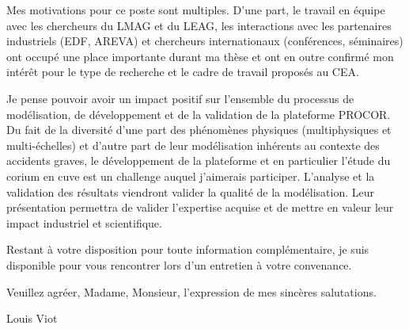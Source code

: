 \documentclass[11pt]{article}
\begin{document}
Mes motivations pour ce poste sont multiples. D'une part, le travail en équipe avec les chercheurs du LMAG et du LEAG, les interactions avec les partenaires industriels (EDF, AREVA) et chercheurs internationaux (conférences, séminaires) ont occupé une place importante durant ma thèse et ont en outre confirmé mon intérêt pour le type de recherche et le cadre de travail proposés au CEA.

Je pense pouvoir avoir un impact positif sur l'ensemble du processus de modélisation, de développement et de la validation de la plateforme PROCOR. Du fait de la diversité d'une part des phénomènes physiques (multiphysiques et multi-échelles) et d'autre part de leur modélisation inhérents au contexte des accidents graves, le développement de la plateforme et en particulier l'étude du corium en cuve est un challenge auquel j'aimerais participer. L'analyse et la validation des résultats viendront valider la qualité de la modélisation. Leur présentation permettra de valider l'expertise acquise et de mettre en valeur leur impact industriel et scientifique.

Restant à votre disposition pour toute information complémentaire, je suis disponible pour vous rencontrer lors d’un entretien à votre convenance.

Veuillez agréer, Madame, Monsieur, l’expression de mes sincères salutations.

\begin{flushright}
Louis Viot
\end{flushright}
\end{document}
